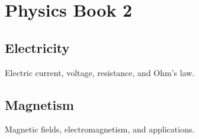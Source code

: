 \chapter{Physics Book 2}

\section{Electricity}
Electric current, voltage, resistance, and Ohm's law.

\section{Magnetism}
Magnetic fields, electromagnetism, and applications.
